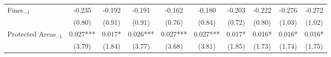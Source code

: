 \begin{landscape}
\begin{table}[htp!]
\begin{tabularx}{0.82\linewidth}{l C C C C C C C C C}
    Fines$_{-1}$ & 	-0.235	&	-0.192	&	-0.191	&	-0.162	&	-0.180	&	-0.203	&	-0.222	&	-0.276	&	-0.272	\\
                    & 		(0.80)	&	(0.91)	&	(0.91)	&	(0.76)	&	(0.84)	&	(0.72)	&	(0.80)	&	(1.03)	&	(1.02)	\\
    Protected Areas$_{-1}$ & 0.027***	&	0.017*	&	0.026***	&	0.027***	&	0.027***	&	0.017*	&	0.016*	&	0.016*	&	0.016*	\\
                    & 		(3.79)	&	(1.84)	&	(3.77)	&	(3.68)	&	(3.81)	&	(1.85)	&	(1.73)	&	(1.74)	&	(1.75)	\\

\end{tabularx}
\end{table}
\end{landscape}
